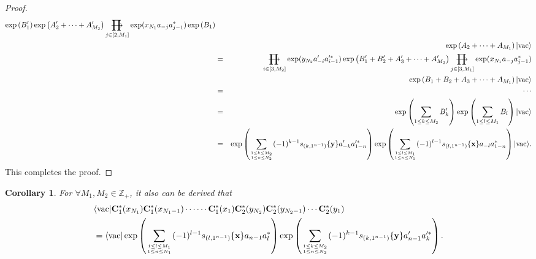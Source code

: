 \documentclass[11pt,reqno]{amsart}
\numberwithin{equation}{section}
\newtheorem{corollary}[theorem]{Corollary}
\def\rprod{\mathop{\prod{\mkern-28.0mu}{\mathbf\longrightarrow}}}
\begin{document}
\begin{proof}
\begin{eqnarray}
\exp\left(B^{\prime}_{1}\right)\exp\left(A^{\prime}_{2}+\cdots+A^{\prime}_{M_{2}}\right)
\rprod\limits_{j\in[2,M_{1}]}\exp(x_{N_{1}}a_{-j}a^{\ast}_{j-1})
\exp\left(B_{1}\right)\notag\\
&&\exp\left(A_{2}+\cdots+A_{M_{1}}\right)|\text{vac}\rangle\notag\\
&=&\rprod\limits_{i\in[3,M_{2}]}\exp(y_{N_{2}}a^{\prime}_{-i}a^{\prime\ast}_{i-1})
\exp\left(B^{\prime}_{1}+B^{\prime}_{2}+A^{\prime}_{3}+\cdots+A^{\prime}_{M_{2}}\right)
\rprod\limits_{j\in[3,M_{1}]}\exp(x_{N_{1}}a_{-j}a^{\ast}_{j-1})\notag\\
&&\exp\left(B_{1}+B_{2}+A_{3}+\cdots+A_{M_{1}}\right)|\text{vac}\rangle\notag\\
&=&\cdots\notag\\
&=&\exp\left(\sum\limits_{1\leq k\leq M_{2}}B^{\prime}_{k}\right)
\exp\left(\sum\limits_{1\leq l\leq M_{1}}B_{l}\right)|\text{vac}\rangle\notag\\
&=&\exp\left(\sum\limits_{1\leq k\leq M_{2}\atop{1\leq n\leq N_{2}}}(-1)^{k-1}s_{(k,1^{n-1})}\{\mathbf{y}\}a^{\prime}_{-k}a^{\prime\ast}_{1-n}\right)
\exp\left(\sum\limits_{1\leq l\leq M_{1}\atop{1\leq n\leq N_{1}}}(-1)^{l-1}s_{(l,1^{n-1})}\{\mathbf{x}\}a_{-l}a^{\ast}_{1-n}\right)|\text{vac}\rangle.
\notag\\
\end{eqnarray}
This completes the proof.
\end{proof}

\begin{corollary}
For $\forall M_{1}, M_{2}\in\mathbb{Z}_{+}$, it also can be derived that
\begin{align}
&\langle\text{vac}|\mathbf{C}^{\ast}_{1}(x_{N_{1}})\mathbf{C}^{\ast}_{1}(x_{N_{1}-1})
\cdots\cdots\mathbf{C}^{\ast}_{1}(x_{1})\mathbf{C}^{\ast}_{2}(y_{N_{2}})
\mathbf{C}^{\ast}_{2}(y_{N_{2}-1})\cdots\mathbf{C}^{\ast}_{2}(y_{1})\notag\\
&=\langle\text{vac}|\exp\left(\sum\limits_{1\leq l\leq M_{1}\atop{1\leq n\leq N_{1}}}(-1)^{l-1}s_{(l,1^{n-1})}\{\mathbf{x}\}a_{n-1}a^{\ast}_{l}\right)
\exp\left(\sum\limits_{1\leq k\leq M_{2}\atop{1\leq n\leq N_{2}}}(-1)^{k-1}s_{(k,1^{n-1})}\{\mathbf{y}\}a^{\prime}_{n-1}a^{\prime\ast}_{k}\right).
\end{align}
\end{corollary}
\end{document}
